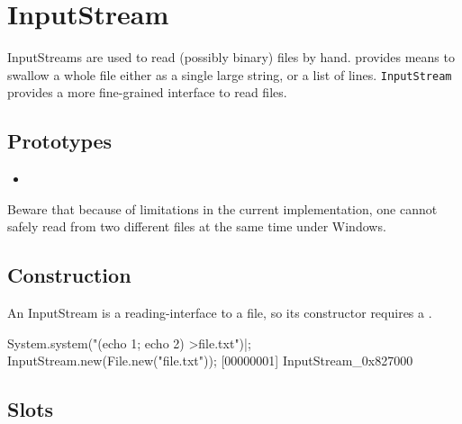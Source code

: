 \section{InputStream}

InputStreams are used to read (possibly binary) files by hand.
 provides means to swallow a whole file either as a
single large string, or a list of lines.  \lstinline|InputStream|
provides a more fine-grained interface to read files.

\subsection{Prototypes}
\begin{itemize}
\item {}
\end{itemize}

\begin{windows}
  Beware that because of limitations in the current implementation,
  one cannot safely read from two different files at the same time
  under Windows.
\end{windows}

\subsection{Construction}

An InputStream is a reading-interface to a file, so its constructor
requires a .

\begin{urbiscript}[firstnumber=1]
System.system("(echo 1; echo 2) >file.txt")|;
InputStream.new(File.new("file.txt"));
[00000001] InputStream_0x827000
\end{urbiscript}

\subsection{Slots}

